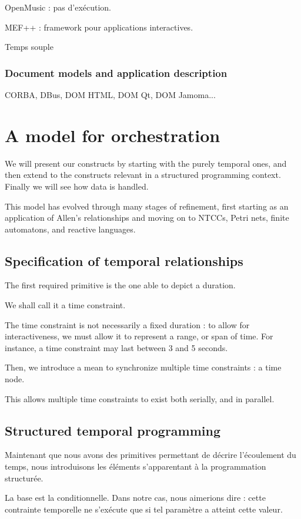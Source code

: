 \documentclass{sigchi}
\begin{document}
OpenMusic : pas d'exécution.

MEF++\cite{ackermann_direct_1994} : framework pour applications interactives.

Temps souple\cite{song_interactive_1999}


\subsubsection{Document models and application description} %
CORBA, DBus, DOM HTML, DOM Qt, DOM Jamoma...


\section{A model for orchestration}
We will present our constructs by starting with the purely temporal ones, 
and then extend to the constructs relevant in a structured programming context.
Finally we will see how data is handled.

This model has evolved through many stages of refinement, first starting as an application of 
Allen's relationships and moving on to NTCCs, Petri nets, finite automatons, and reactive languages.

\subsection{Specification of temporal relationships}\label{sec.temporal}
The first required primitive is the one able to depict a duration.

We shall call it a time constraint.

The time constraint is not necessarily a fixed duration : to allow for interactiveness, 
we must allow it to represent a range, or span of time. For instance, a time constraint may last between 3 and 5 seconds.

Then, we introduce a mean to synchronize multiple time constraints : a time node. 

This allows multiple time constraints to exist both serially, and in parallel. 


\subsection{Structured temporal programming}
Maintenant que nous avons des primitives permettant de décrire l'écoulement du temps, nous introduisons les éléments s'apparentant à la programmation structurée.

La base est la conditionnelle. Dans notre cas, nous aimerions dire : cette contrainte temporelle ne s'exécute que si tel paramètre a atteint cette valeur.
\end{document}
